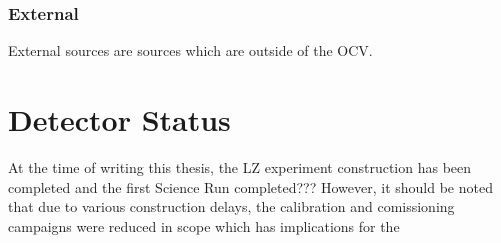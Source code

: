 \subsubsection{External}
\par
External sources are sources which are outside of the OCV.

\section{Detector Status}
\par
At the time of writing this thesis, the LZ experiment construction has been completed and the first Science Run completed???
However, it should be noted that due to various construction delays, the calibration and comissioning campaigns were reduced in scope which has implications for the 

